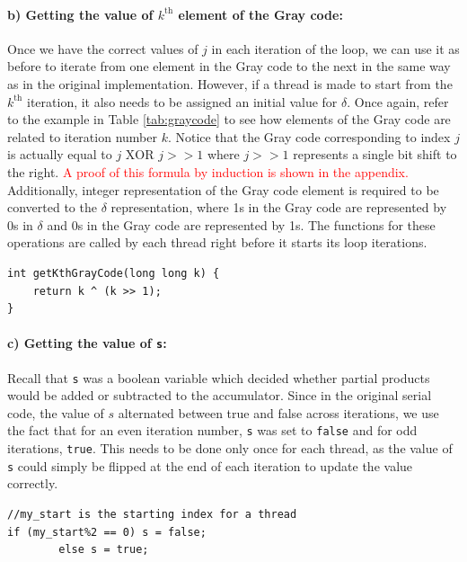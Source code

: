 \documentclass[11pt]{article}
\theoremstyle{theorem}
\theoremstyle{remark}
\theoremstyle{plain}
\theoremstyle{definition}
\begin{document}
\paragraph{b) Getting the value of $k^{\text{th}}$ element of the Gray code:} Once we have the correct values of $j$ in each iteration of the loop, we can use it as before to iterate from one element in the Gray code to the next in the same way as in the original implementation. However, if a thread is made to start from the $k^{\text{th}}$ iteration, it also needs to be assigned an initial value for $\delta$. Once again, refer to the example in Table \ref{tab:graycode} to see how elements of the Gray code are related to iteration number $k$. Notice that the Gray code corresponding to index $j$ is actually equal to $j \text{ XOR } j >> 1$ where $j >> 1$ represents a single bit shift to the right. \textcolor{red}{A proof of this formula by induction is shown in the appendix.} Additionally, integer representation of the Gray code element is required to be converted to the $\delta$ representation, where 1s in the Gray code are represented by 0s in $\delta$ and 0s in the Gray code are represented by 1s. The functions for these operations are called by each thread right before it starts its loop iterations.
\begin{verbatim}
int getKthGrayCode(long long k) {
    return k ^ (k >> 1);
}
\end{verbatim}

\paragraph{c) Getting the value of \texttt{s}:} Recall that \texttt{s} was a boolean variable which decided whether partial products would be added or subtracted to the accumulator. Since in the original serial code, the value of $s$ alternated between true and false across iterations, we use the fact that for an even iteration number, \texttt{s} was set to \texttt{false} and for odd iterations, \texttt{true}. This needs to be done only once for each thread, as the value of \texttt{s} could simply be flipped at the end of each iteration to update the value correctly.
\begin{verbatim}
//my_start is the starting index for a thread
if (my_start%2 == 0) s = false;
		else s = true;
\end{verbatim}
\end{document}
